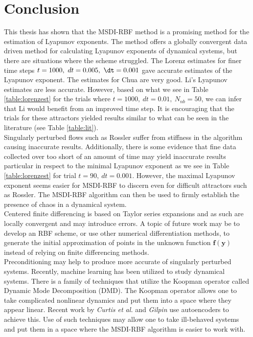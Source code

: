 \chapter{Conclusion}

            This thesis has shown that the MSDI-RBF method is a promising method for the estimation of Lyapunov exponents.
            The method offers a globally convergent data driven method for calculating Lyapunov exponents of dynamical systems,
            but there are situations where the scheme struggled. The Lorenz estimates for finer time steps $t=1000, \ dt=0.005, \ \dt=0.001$
            gave accurate estimates of the Lyapunov exponent. The estimates for Chua are very good. Li's Lyapunov estimates are less accurate.
            However, based on what we see in Table \ref{table:lorenzest} for the trials where $t=1000, \ dt=0.01, \ N_{nb}=50$,
            we can infer that Li would benefit from an improved time step. It is encouraging that the trials for these attractors
            yielded results similar to what can be seen in the literature (see Table \ref{table:lit}).\\

            Singularly perturbed flows such as Rossler suffer from
            stiffness in the algorithm causing inaccurate results.
            Additionally, there is some evidence that fine data collected over too short of an amount of time may yield inaccurate
            results particular in respect to the minimal Lyapunov exponent as we see in Table \ref{table:lorenzest} for trial $t=90, \ dt=0.001$. However, the maximal Lyapunov exponent seems
            easier for MSDI-RBF to discern even for difficult attractors such as Rossler. The MSDI-RBF algorithm can then
            be used to firmly establish the presence of chaos in a dynamical system.\\

            Centered finite differencing is based on Taylor
            series expansions and as such are locally convergent and may introduce errors. A topic
            of future work may be to develop an RBF scheme, or use other numerical differentiation methods, to generate the initial approximation of points in the unknown function $\mathbf{f}(\mathbf{y})$
            instead of relying on finite differencing methods.\\

            Preconditioning may help to produce more accurate of singularly perturbed systems. Recently, machine learning has
            been utilized to study dynamical systems. There is a family of techniques that utilize the Koopman operator called
            Dynamic Mode Decomposition (DMD). The Koopman operator allows one to take complicated nonlinear dynamics and
            put them into a space where they appear linear. Recent work by \textit{Curtis et al.} \cite{item:10} and \textit{Gilpin}
            \cite{item:20} use autoencoders to achieve this. Use of such techniques may allow one to take ill-behaved systems
            and put them in a space where the MSDI-RBF algorithm is easier to work with.\\


